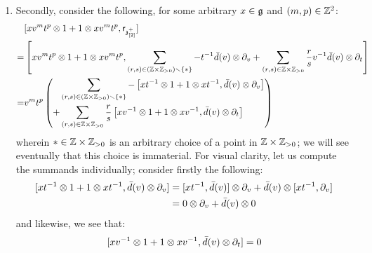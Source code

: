 \begin{remark}
\begin{enumerate}
\begin{enumerate}
                        \item Secondly, consider the following, for some arbitrary $x \in \mathfrak{g}$ and $(m, p) \in \mathbb{Z}^2$:
                            $$
                                \begin{aligned}
                                    & [ x v^m t^p \tensor 1 + 1 \tensor x v^m t^p, \sfr_{ \z_{[2]}^+ }]
                                    \\
                                    = & \left[ x v^m t^p \tensor 1 + 1 \tensor x v^m t^p, \sum_{(r, s) \in (\Z \x \Z_{> 0}) \setminus \{*\}} -t^{-1} \bar{d}(v) \tensor \del_v + \sum_{(r, s) \in \Z \x \Z_{> 0}} \frac{r}{s} v^{-1} \bar{d}(v) \tensor \del_t\right]
                                    \\
                                    = & v^m t^p \left(
                                    \begin{aligned}
                                        & \sum_{(r, s) \in (\Z \x \Z_{> 0}) \setminus \{*\}} -\left[ x t^{-1} \tensor 1 + 1 \tensor x t^{-1}, \bar{d}(v) \tensor \del_v \right]
                                        \\
                                        + & \sum_{(r, s) \in \Z \x \Z_{> 0}} \frac{r}{s} \left[ x v^{-1} \tensor 1 + 1 \tensor x v^{-1}, \bar{d}(v) \tensor \del_t \right]
                                    \end{aligned}
                                    \right)
                                \end{aligned}
                            $$
                        wherein $* \in \Z \x \Z_{> 0}$ is an arbitrary choice of a point in $\Z \x \Z_{> 0}$; we will see eventually that this choice is immaterial. For visual clarity, let us compute the summands individually; consider firstly the following:
                            $$
                                \begin{aligned}
                                    [ x t^{-1} \tensor 1 + 1 \tensor x t^{-1}, \bar{d}(v) \tensor \del_v ] & = [xt^{-1}, \bar{d}(v)] \tensor \del_v + \bar{d}(v) \tensor [xt^{-1}, \del_v]
                                    \\
                                    & = 0 \tensor \del_v + \bar{d}(v) \tensor 0
                                \end{aligned}
                            $$
                        and likewise, we see that:
                            $$[x v^{-1} \tensor 1 + 1 \tensor x v^{-1}, \bar{d}(v) \tensor \del_t] = 0$$

\end{enumerate}
\end{enumerate}
\end{remark}
